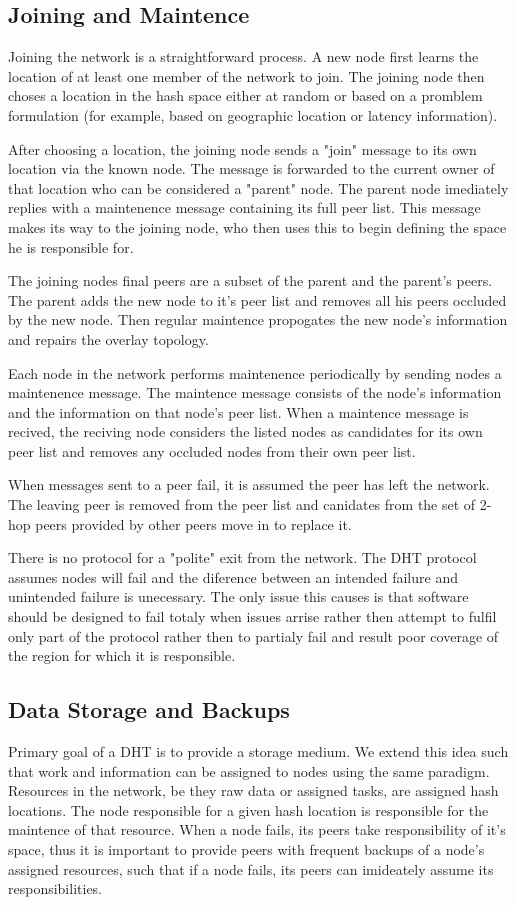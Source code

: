 \documentclass[11pt]{IEEEtran} %
\begin{document}
\subsection{Joining and Maintence}
Joining the network is a straightforward process. A new node first learns the location of at least one member of the network to join. The joining node then choses a location in the hash space either at random or based on a promblem formulation (for example, based on geographic location or latency information).

After choosing a location, the joining node sends a "join" message to its own location via the known node.
The message is forwarded to the current owner of that location who can be considered a "parent" node.
The parent node imediately replies with a maintenence message containing its full peer list. This message makes its way to the joining node, who then uses this to begin defining the space he is responsible for. 

The joining nodes final peers are a subset of the parent and the parent's peers. The parent adds the new node to it's peer list and removes all his peers occluded by the new node.  Then regular maintence propogates the new node's information and repairs the overlay topology.

Each node in the network performs maintenence periodically by sending nodes a maintenence message. The maintence message consists of the node's information and the information on that node's peer list. When a maintence message is recived, the reciving node considers the listed nodes as candidates for its own peer list and removes any occluded nodes from their own peer list. 

When messages sent to a peer fail, it is assumed the peer has left the network. The leaving peer is removed from the peer list and canidates from the set of 2-hop peers provided by other peers move in to replace it.

There is no protocol for a "polite" exit from the network. The DHT protocol assumes nodes will fail and the diference between an intended failure and unintended failure is unecessary. The only issue this causes is that software should be designed to fail totaly when issues arrise rather then attempt to fulfil only part of the protocol rather then to partialy fail and result poor coverage of the region for which it is responsible.

\subsection{Data Storage and Backups}
Primary goal of a DHT is to provide a storage medium. We extend this idea such that work and information can be assigned to nodes using the same paradigm. Resources in the network, be they raw data or assigned tasks, are assigned hash locations. The node responsible for a given hash location is responsible for the maintence of that resource. When a node fails, its peers take responsibility of it's space, thus it is important to provide peers with frequent backups of a node's assigned resources, such that if a node fails, its peers can imideately assume its responsibilities.
\end{document}
